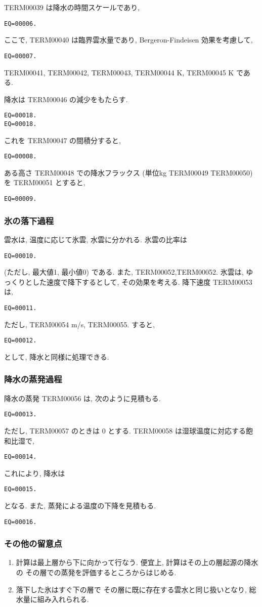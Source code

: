 TERM00039 は降水の時間スケールであり,
\begin{verbatim}
EQ=00006.
\end{verbatim}
ここで, TERM00040 は臨界雲水量であり,
Bergeron-Findeisen 効果を考慮して,
\begin{verbatim}
EQ=00007.
\end{verbatim}
TERM00041, TERM00042, TERM00043, 
TERM00044 K, TERM00045 K である.

降水は TERM00046 の減少をもたらす.
\begin{verbatim}
EQ=00018.
EQ=00018.
\end{verbatim}
これを TERM00047 の間積分すると,
\begin{verbatim}
EQ=00008.
\end{verbatim}

ある高さ TERM00048 での降水フラックス
(単位kg TERM00049 TERM00050)を TERM00051 とすると,
\begin{verbatim}
EQ=00009.
\end{verbatim}

\subsubsection{氷の落下過程}

雲水は, 温度に応じて氷雲, 水雲に分かれる.
氷雲の比率は
\begin{verbatim}
EQ=00010.
\end{verbatim}
(ただし, 最大値1, 最小値0) である. また,
TERM00052,TERM00052.
氷雲は, ゆっくりとした速度で降下するとして, 
その効果を考える. 降下速度 TERM00053 は,
\begin{verbatim}
EQ=00011.
\end{verbatim}
ただし, TERM00054 m/s, TERM00055.
すると, 
\begin{verbatim}
EQ=00012.
\end{verbatim}
として, 降水と同様に処理できる.

\subsubsection{降水の蒸発過程}

降水の蒸発 TERM00056 は, 次のように見積もる.

\begin{verbatim}
EQ=00013.
\end{verbatim}
ただし, TERM00057 のときは 0 とする.
TERM00058 は湿球温度に対応する飽和比湿で,
\begin{verbatim}
EQ=00014.
\end{verbatim}
%
これにより, 降水は
\begin{verbatim}
EQ=00015.
\end{verbatim}
となる. また, 蒸発による温度の下降を見積もる.
\begin{verbatim}
EQ=00016.
\end{verbatim}

\subsubsection{その他の留意点}

\begin{enumerate}
\item 計算は最上層から下に向かって行なう.
      便宜上, 計算はその上の層起源の降水の
      その層での蒸発を評価するところからはじめる.
\item 落下した氷はすぐ下の層で
      その層に既に存在する雲水と同じ扱いとなり,
      総水量に組み入れられる.
\end{enumerate}



